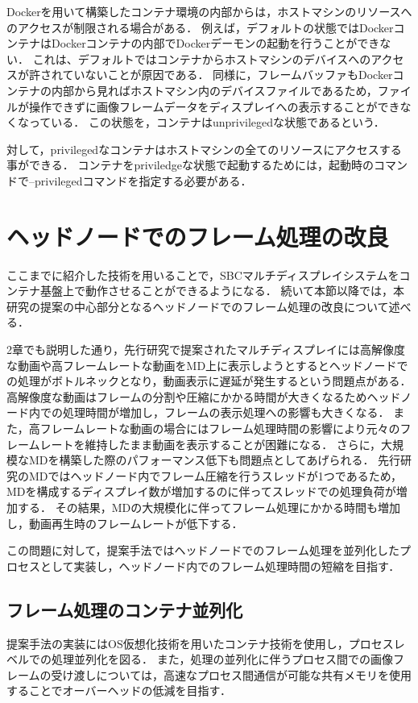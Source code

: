 Dockerを用いて構築したコンテナ環境の内部からは，ホストマシンのリソースへのアクセスが制限される場合がある．
例えば，デフォルトの状態ではDockerコンテナはDockerコンテナの内部でDockerデーモンの起動を行うことができない．
これは、デフォルトではコンテナからホストマシンのデバイスへのアクセスが許されていないことが原因である．
同様に，フレームバッファもDockerコンテナの内部から見ればホストマシン内のデバイスファイルであるため，ファイルが操作できずに画像フレームデータをディスプレイへの表示することができなくなっている．
この状態を，コンテナはunprivilegedな状態であるという．

対して，privilegedなコンテナはホストマシンの全てのリソースにアクセスする事ができる．
コンテナをpriviledgeな状態で起動するためには，起動時のコマンドで--privilegedコマンドを指定する必要がある．

\section{ヘッドノードでのフレーム処理の改良}
ここまでに紹介した技術を用いることで，SBCマルチディスプレイシステムをコンテナ基盤上で動作させることができるようになる．
続いて本節以降では，本研究の提案の中心部分となるヘッドノードでのフレーム処理の改良について述べる．

2章でも説明した通り，先行研究で提案されたマルチディスプレイには高解像度な動画や高フレームレートな動画をMD上に表示しようとするとヘッドノードでの処理がボトルネックとなり，動画表示に遅延が発生するという問題点がある．
高解像度な動画はフレームの分割や圧縮にかかる時間が大きくなるためヘッドノード内での処理時間が増加し，フレームの表示処理への影響も大きくなる．
また，高フレームレートな動画の場合にはフレーム処理時間の影響により元々のフレームレートを維持したまま動画を表示することが困難になる．
さらに，大規模なMDを構築した際のパフォーマンス低下も問題点としてあげられる．
先行研究のMDではヘッドノード内でフレーム圧縮を行うスレッドが1つであるため，MDを構成するディスプレイ数が増加するのに伴ってスレッドでの処理負荷が増加する．
その結果，MDの大規模化に伴ってフレーム処理にかかる時間も増加し，動画再生時のフレームレートが低下する．

この問題に対して，提案手法ではヘッドノードでのフレーム処理を並列化したプロセスとして実装し，ヘッドノード内でのフレーム処理時間の短縮を目指す．

\subsection*{フレーム処理のコンテナ並列化}
提案手法の実装にはOS仮想化技術を用いたコンテナ技術を使用し，プロセスレベルでの処理並列化を図る．
また，処理の並列化に伴うプロセス間での画像フレームの受け渡しについては，高速なプロセス間通信が可能な共有メモリを使用することでオーバーヘッドの低減を目指す．


